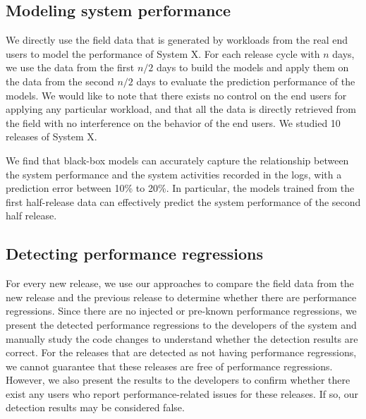 \subsection{Modeling system performance}

We directly use the field data that is generated by workloads from the real end users to model the performance of System X. For each release cycle with $n$ days, we use the data from the first $n/2$ days to build the models and apply them on the data from the second $n/2$ days to evaluate the prediction performance of the models. We would like to note that there exists no control on the end users for applying any particular workload, and that all the data is directly retrieved from the field with no interference on the behavior of the end users. We studied 10 releases of System X.

We find that black-box models can accurately capture the relationship between the system performance and the system activities recorded in the logs, with a prediction error between 10\% to 20\%.
In particular, the models trained from the first half-release data can effectively predict the system performance of the second half release.

\subsection{Detecting performance regressions}

For every new release, we use our approaches to compare the field data from the new release and the previous release to determine whether there are performance regressions. Since there are no injected or pre-known performance regressions, we present the detected performance regressions to the developers of the system and manually study the code changes to understand whether the detection results are correct. For the releases that are detected as not having performance regressions, we cannot guarantee that these releases are free of performance regressions. However, we also present the results to the developers to confirm whether there exist any users who report performance-related issues for these releases. If so, our detection results may be considered false.


